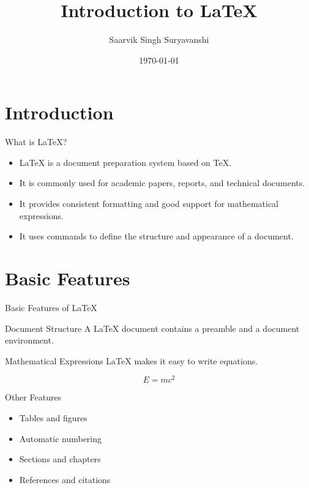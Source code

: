 \documentclass{beamer}
\title[Introduction to LaTeX]{Introduction to LaTeX}
\author[Saarvik Singh]{Saarvik Singh Suryavanshi}
\institute[MNIT Jaipur]{
	MNIT Jaipur \\
	Technical Writing \\
	Course Coordinator: Neeta Nain
}
\date{\today}
\begin{document}
	
	\begin{frame}
		\titlepage
	\end{frame}
	
	\section{Introduction}
	
	\begin{frame}{What is LaTeX?}
		
		\begin{itemize}
			\item LaTeX is a document preparation system
			based on TeX.
			
			\vspace{0.3cm}
			
			\item It is commonly used for academic papers,
			reports, and technical documents.
			
			\vspace{0.3cm}
			
			\item It provides consistent formatting and
			good support for mathematical expressions.
			
			\vspace{0.3cm}
			
			\item It uses commands to define the structure
			and appearance of a document.
		\end{itemize}
		
	\end{frame}
	
	\section{Basic Features}
	
	\begin{frame}{Basic Features of LaTeX}
		
		\begin{block}{Document Structure}
			A LaTeX document contains a preamble and
			a document environment.
		\end{block}
		
		\begin{block}{Mathematical Expressions}
			LaTeX makes it easy to write equations.
			
			\[
			E = mc^2
			\]
		\end{block}
		
		\begin{block}{Other Features}
			\begin{itemize}
				\item Tables and figures
				\item Automatic numbering
				\item Sections and chapters
				\item References and citations
			\end{itemize}
		\end{block}
		
	\end{frame}
	
\end{document}
